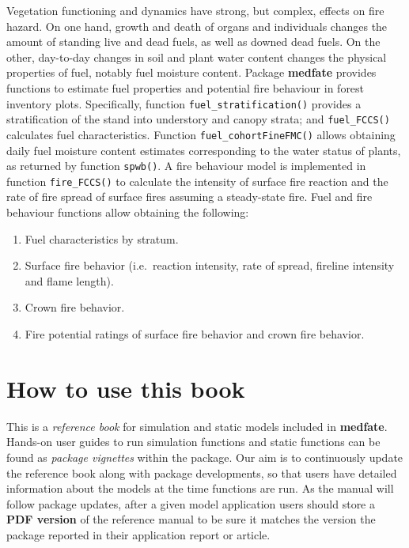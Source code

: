 \documentclass[]{book}
\providecommand{\tightlist}{%
  \setlength{\itemsep}{0pt}\setlength{\parskip}{0pt}}
\begin{document}
Vegetation functioning and dynamics have strong, but complex, effects on
fire hazard. On one hand, growth and death of organs and individuals
changes the amount of standing live and dead fuels, as well as downed
dead fuels. On the other, day-to-day changes in soil and plant water
content changes the physical properties of fuel, notably fuel moisture
content. Package \textbf{medfate} provides functions to estimate fuel
properties and potential fire behaviour in forest inventory plots.
Specifically, function \texttt{fuel\_stratification()} provides a
stratification of the stand into understory and canopy strata; and
\texttt{fuel\_FCCS()} calculates fuel characteristics. Function
\texttt{fuel\_cohortFineFMC()} allows obtaining daily fuel moisture
content estimates corresponding to the water status of plants, as
returned by function \texttt{spwb()}. A fire behaviour model is
implemented in function \texttt{fire\_FCCS()} to calculate the intensity
of surface fire reaction and the rate of fire spread of surface fires
assuming a steady-state fire. Fuel and fire behaviour functions allow
obtaining the following:

\begin{enumerate}
\def\labelenumi{\arabic{enumi}.}
\tightlist
\item
  Fuel characteristics by stratum.
\item
  Surface fire behavior (i.e.~reaction intensity, rate of spread,
  fireline intensity and flame length).
\item
  Crown fire behavior.
\item
  Fire potential ratings of surface fire behavior and crown fire
  behavior.
\end{enumerate}

\section{How to use this book}\label{how-to-use-this-book}

This is a \emph{reference book} for simulation and static models
included in \textbf{medfate}. Hands-on user guides to run simulation
functions and static functions can be found as \emph{package vignettes}
within the package. Our aim is to continuously update the reference book
along with package developments, so that users have detailed information
about the models at the time functions are run. As the manual will
follow package updates, after a given model application users should
store a \textbf{PDF version} of the reference manual to be sure it
matches the version the package reported in their application report or
article.
\end{document}
